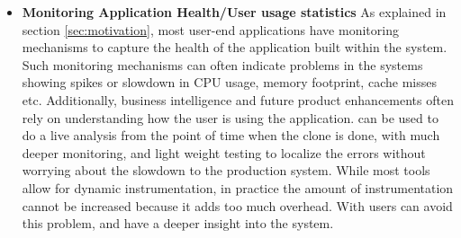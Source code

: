 \begin{itemize}
\item \textbf{Monitoring Application Health/User usage statistics}
As explained in section \ref{sec:motivation}, most user-end applications have monitoring mechanisms to capture the health of the application built within the system.
Such monitoring mechanisms can often indicate problems in the systems showing spikes or slowdown in CPU usage, memory footprint, cache misses etc.
Additionally, business intelligence and future product enhancements often rely on understanding how the user is using the application.
\parikshan can be used to do a live analysis from the point of time when the clone is done, with much deeper monitoring, and light weight testing to localize the errors without worrying about the slowdown to the production system.
While most tools allow for dynamic instrumentation, in practice the amount of instrumentation cannot be increased because it adds too much overhead.
With \parikshan users can avoid this problem, and have a deeper insight into the system.


\end{itemize}
